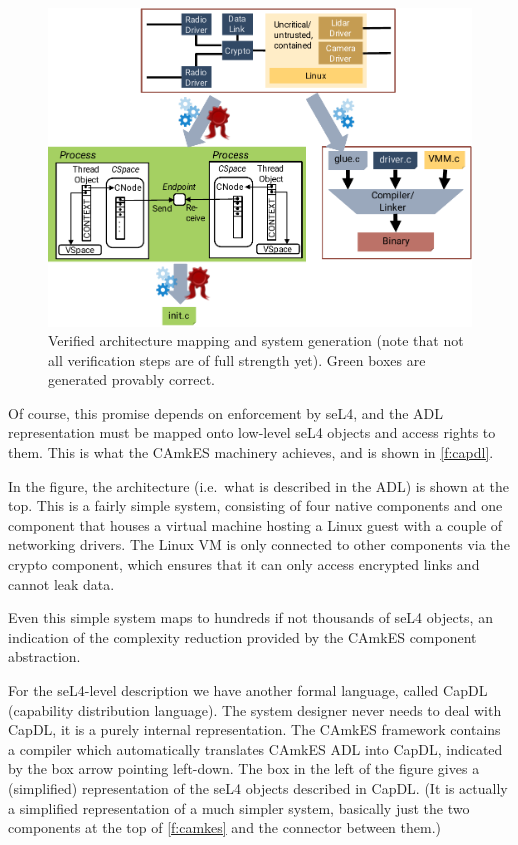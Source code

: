 \documentclass[english,a4paper,12pt\ifDraft,draft\fi]{report}
\begin{document}
  \begin{figure}[hb]
    \centering
    \includegraphics[width=\textwidth]{capdl}
    \caption{Verified architecture mapping and system generation
      (note that not all verification steps are of full strength
      yet). Green boxes are generated provably correct.}
    \label{f:capdl}
  \end{figure}

  Of course, this promise depends on enforcement by seL4, and the ADL
  representation must be mapped onto low-level seL4 objects and access
  rights to them. This is what the CAmkES machinery achieves, and is
  shown in \autoref{f:capdl}.

  In the figure, the architecture (i.e.\ what is described in the ADL)
  is shown at the top. This is a fairly simple system, consisting of
  four native components and one component that houses a virtual
  machine hosting a Linux guest with a couple of networking
  drivers. The Linux VM is only connected to other components via the
  crypto component, which ensures that it can only access encrypted
  links and cannot leak data.

  Even this simple system maps to hundreds if not thousands of seL4
  objects, an indication of the complexity reduction provided by the
  CAmkES component abstraction.

  For the seL4-level description we have another formal language,
  called CapDL (capability distribution language). The system designer
  never needs to deal with CapDL, it is a purely internal
  representation. The CAmkES framework contains a compiler which
  automatically translates CAmkES ADL into CapDL, indicated by the box
  arrow pointing left-down. The box in the left of the figure gives a
  (simplified) representation of the seL4 objects described in
  CapDL. (It is actually a simplified representation of a much simpler
  system, basically just the two components at the top of
  \autoref{f:camkes} and the connector between them.)
\end{document}
